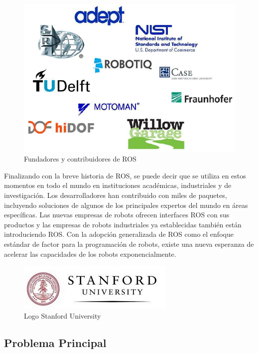         \begin{figure}[htbp]
            \centering
            \includegraphics[width=0.65\linewidth]{Main/Chapter3/Images3/3-4/entidade-asociadas-al-inicio-de-ros-2.png}
            \caption{Fundadores y contribuidores de ROS} 
            \label{f:Cap3-4_entidades_inicio_ros_33364}
        \end{figure}    
        
        Finalizando con la breve historia de ROS, se puede decir que se utiliza en estos momentos en todo el mundo en instituciones académicas, industriales y de investigación. Los desarrolladores han contribuido con miles de paquetes, incluyendo soluciones de algunos de los principales expertos del mundo en áreas específicas. Las nuevas empresas de robots ofrecen interfaces ROS con sus productos y las empresas de robots industriales ya establecidas también están introduciendo ROS. Con la adopción generalizada de ROS como el enfoque estándar de factor para la programación de robots, existe una nueva esperanza de acelerar las capacidades de los robots exponencialmente.
        
        \begin{figure}[htbp]
            \centering
            \includegraphics[width=0.6\linewidth]{Main/Chapter3/Images3/Stanford-University-logo1.jpg}
            \caption{Logo Stanford University \cite{stanford}} 
            \label{f:Cap3-4_entidades_inicio_ros_32}
        \end{figure}

    \newpage

    \subsection{Problema Principal}
    
